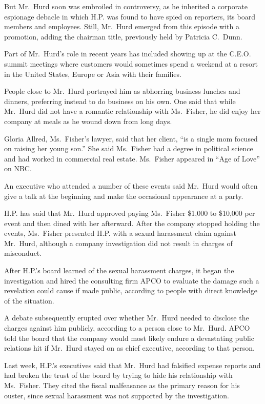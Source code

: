 ﻿\documentclass[12pt]{article}
\begin{document}
But Mr.~Hurd soon was embroiled in controversy, as he inherited a corporate espionage debacle in
which H.P. was found to have spied on reporters, its board members and employees. Still, Mr.~Hurd
emerged from this episode with a promotion, adding the chairman title, previously held by Patricia
C.~Dunn.

Part of Mr.~Hurd's role in recent years has included showing up at the C.E.O. summit meetings where
customers would sometimes spend a weekend at a resort in the United States, Europe or Asia with
their families.

People close to Mr.~Hurd portrayed him as abhorring business lunches and dinners, preferring instead
to do business on his own. One said that while Mr.~Hurd did not have a romantic relationship with
Ms.~Fisher, he did enjoy her company at meals as he wound down from long days.

Gloria Allred, Ms.~Fisher's lawyer, said that her client, ``is a single mom focused on raising her
young son.'' She said Ms.~Fisher had a degree in political science and had worked in commercial real
estate. Ms.~Fisher appeared in ``Age of Love'' on NBC.

An executive who attended a number of these events said Mr.~Hurd would often give a talk at the
beginning and make the occasional appearance at a party.

H.P. has said that Mr.~Hurd approved paying Ms.~Fisher \$1,000 to \$10,000 per event and then dined
with her afterward. After the company stopped holding the events, Ms.~Fisher presented H.P. with a
sexual harassment claim against Mr.~Hurd, although a company investigation did not result in charges
of misconduct.

After H.P.'s board learned of the sexual harassment charges, it began the investigation and hired
the consulting firm APCO to evaluate the damage such a revelation could cause if made public,
according to people with direct knowledge of the situation.

A debate subsequently erupted over whether Mr.~Hurd needed to disclose the charges against him
publicly, according to a person close to Mr.~Hurd. APCO told the board that the company would most
likely endure a devastating public relations hit if Mr.~Hurd stayed on as chief executive, according
to that person.

Last week, H.P.'s executives said that Mr.~Hurd had falsified expense reports and had broken the
trust of the board by trying to hide his relationship with Ms.~Fisher. They cited the fiscal
malfeasance as the primary reason for his ouster, since sexual harassment was not supported by the
investigation.
\end{document}

